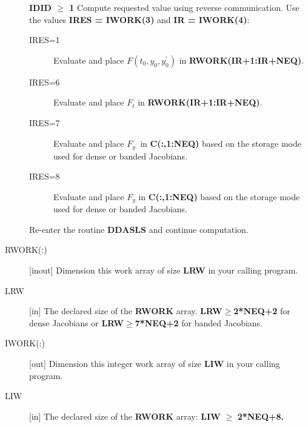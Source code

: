 \documentclass[twoside]{MATH77}
\begin{document}
\begin{description}
\textbf{IDID $\geq$ 1} Compute requested value using reverse communication.
Use the values \textbf{IRES = IWORK(3)} and \textbf{IR = IWORK(4)}:
\begin{description}
\item[IRES=1] Evaluate and place $F(t_0,y_0,y^{\prime}_0)$ in
  \textbf{RWORK(IR+1:IR+NEQ)}.
\item[IRES=6] Evaluate and place $F_t$ in \textbf{RWORK(IR+1:IR+NEQ)}.
\item[IRES=7] Evaluate and place $F_{y^{\prime}}$ in
  \textbf{C(:,1:NEQ)} based on the storage mode used for dense or
  banded Jacobians.
\item[IRES=8] Evaluate and place $F_y$ in \textbf{C(:,1:NEQ)} based on
  the storage mode used for dense or banded Jacobians.
\end{description}
Re-enter the routine \textbf{DDASLS} and continue computation. 

\item[RWORK(:)][inout] Dimension this work array of size \textbf{LRW} in your calling
  program.
\item[LRW][in] The declared size of the \textbf{RWORK} array.  
\textbf{LRW}$\geq$\textbf{2*NEQ+2} for dense Jacobians or
\textbf{LRW}$\geq$\textbf{7*NEQ+2} for banded Jacobians.

\item[IWORK(:)][out] Dimension this integer work array of size
  \textbf{LIW} in your calling program.

\item[LIW][in] The declared size of the \textbf{RWORK} array:
  \textbf{LIW }$\geq$\textbf{ 2*NEQ+8.}


\end{description}
\end{document}
